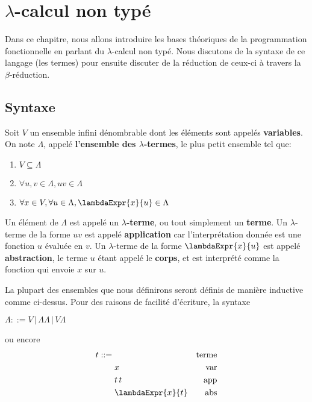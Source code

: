 \chapter{$\lambda$-calcul non typé}

Dans ce chapitre, nous allons introduire les bases théoriques de la
programmation fonctionnelle en parlant du $\lambda$-calcul non typé.
Nous discutons de la syntaxe de ce langage (les termes) pour ensuite discuter de
la réduction de ceux-ci à travers la $\beta$-réduction.

\section{Syntaxe}

\begin{definition} 
  Soit $V$ un ensemble infini dénombrable dont les éléments sont appelés
  \textbf{variables}. On note $\Lambda$, appelé \textbf{l'ensemble des
    $\lambda$-termes}, le plus petit ensemble tel que:
  \begin{enumerate}
    \item $V \subseteq \Lambda$
    \item $\forall u, v \in \Lambda, uv \in \Lambda$
    \item $\forall x \in V, \forall u \in \Lambda, \lambdaExpr{x}{u} \in \Lambda$
  \end{enumerate}
\end{definition}

Un élément de $\Lambda$ est appelé un \textbf{$\lambda$-terme}, ou tout
simplement un \textbf{terme}.
Un $\lambda$-terme de la forme $uv$ est appelé \textbf{application} car
l'interprétation donnée est une fonction $u$ évaluée en $v$.
Un $\lambda$-terme de la forme $\lambdaExpr{x}{u}$ est appelé
\textbf{abstraction}, le terme $u$ étant appelé le \textbf{corps}, et est
interprété comme la fonction qui envoie $x$ sur $u$.

La plupart des ensembles que nous définirons seront définis de manière inductive
comme ci-dessus.
Pour des raisons de facilité d'écriture, la syntaxe
\begin{center}
  \begin{math}
    \Lambda ::= V \, | \, \Lambda \Lambda \, | \, V \Lambda
  \end{math}
\end{center}

ou encore
\begin{align*}
  t ::= & \, & \text{terme} \\
        & \; x & \text{var} \\
        & \; t \, t & \text{app} \\
        & \; \lambdaExpr{x}{t} & \text{abs}
\end{align*}

